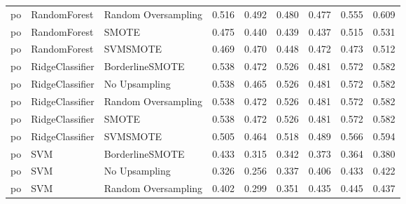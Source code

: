 \begin{tabular}{lllllllll}
      po &                 RandomForest & Random Oversampling & 0.516 &                     0.492 &                 0.480 &                  0.477 &                                   0.555 &     0.609 \\
      po &                 RandomForest &               SMOTE & 0.475 &                     0.440 &                 0.439 &                  0.437 &                                   0.515 &     0.531 \\
      po &                 RandomForest &            SVMSMOTE & 0.469 &                     0.470 &                 0.448 &                  0.472 &                                   0.473 &     0.512 \\
      po &              RidgeClassifier &     BorderlineSMOTE & 0.538 &                     0.472 &                 0.526 &                  0.481 &                                   0.572 &     0.582 \\
      po &              RidgeClassifier &       No Upsampling & 0.538 &                     0.465 &                 0.526 &                  0.481 &                                   0.572 &     0.582 \\
      po &              RidgeClassifier & Random Oversampling & 0.538 &                     0.472 &                 0.526 &                  0.481 &                                   0.572 &     0.582 \\
      po &              RidgeClassifier &               SMOTE & 0.538 &                     0.472 &                 0.526 &                  0.481 &                                   0.572 &     0.582 \\
      po &              RidgeClassifier &            SVMSMOTE & 0.505 &                     0.464 &                 0.518 &                  0.489 &                                   0.566 &     0.594 \\
      po &                          SVM &     BorderlineSMOTE & 0.433 &                     0.315 &                 0.342 &                  0.373 &                                   0.364 &     0.380 \\
      po &                          SVM &       No Upsampling & 0.326 &                     0.256 &                 0.337 &                  0.406 &                                   0.433 &     0.422 \\
      po &                          SVM & Random Oversampling & 0.402 &                     0.299 &                 0.351 &                  0.435 &                                   0.445 &     0.437 \\

\end{tabular}
